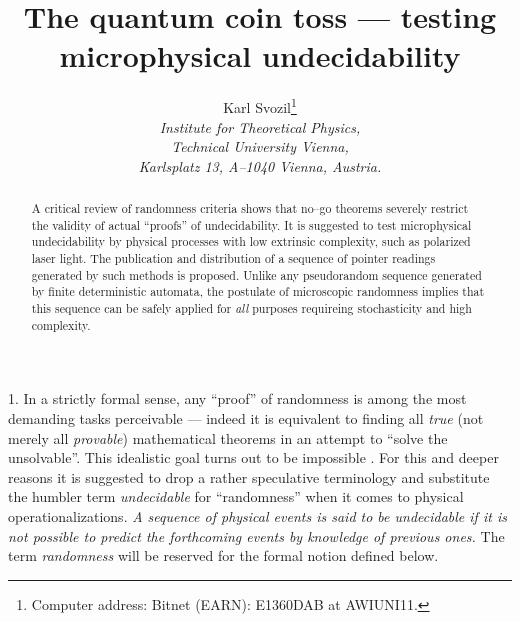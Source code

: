 
\title{The quantum coin toss --- testing microphysical undecidability}
\author{Karl Svozil\thanks{Computer address:
Bitnet (EARN): E1360DAB at AWIUNI11.}\\
{\small \sl Institute for Theoretical Physics,}\\
{\small \sl Technical University Vienna,}\\
{\small \sl Karlsplatz 13, A--1040 Vienna, Austria.}
}
\date{  }

\maketitle
\begin{abstract}
 A critical review of randomness criteria shows that no--go theorems
 severely restrict the validity of actual ``proofs'' of undecidability.
 It is suggested
 to test microphysical undecidability by  physical
 processes with low extrinsic complexity, such as polarized laser
 light.
 The publication and distribution of a sequence of pointer readings
 generated by such methods is proposed.
 Unlike any pseudorandom sequence generated by finite deterministic
 automata, the postulate of microscopic randomness implies that this
 sequence can be safely applied for {\it all} purposes requireing
 stochasticity and high complexity.

\end{abstract}
\vfill \eject

      1. In a strictly formal sense, any ``proof'' of randomness is
 among the most demanding tasks perceivable \cite{chaitin1,chaitin2}
 --- indeed it is equivalent to finding all {\sl true} (not merely all
 {\sl provable}) mathematical theorems in an attempt to ``solve the
 unsolvable''\cite{ford1}.  This idealistic goal turns out to be
 impossible \cite{godel1,chaitin2,baaz1}.
 For this
 and deeper \cite{svozil1} reasons it is suggested to drop  a rather
 speculative terminology and substitute the humbler term {\sl
 undecidable} for ``randomness'' when it comes to physical
 operationalizations. {\sl A sequence of physical events is said to be
 undecidable if it is not possible
 to predict the forthcoming events by knowledge of previous ones.}
 The term {\sl randomness} will be reserved for the formal notion
 defined below.


